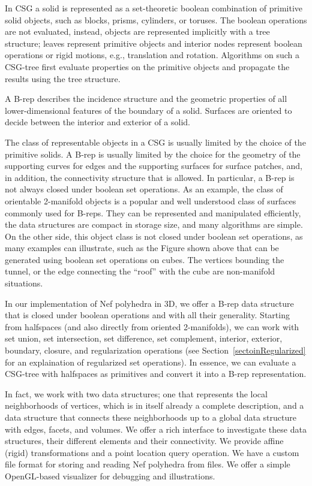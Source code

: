 In CSG a solid is represented as a set-theoretic boolean combination
of primitive solid objects, such as blocks, prisms, cylinders, or
toruses.  The boolean operations are not evaluated, instead, objects
are represented implicitly with a tree structure; leaves represent
primitive objects and interior nodes represent boolean operations or
rigid motions, e.g., translation and rotation. Algorithms on such a
CSG-tree first evaluate properties on the primitive objects and
propagate the results using the tree structure.
 
A B-rep describes the incidence structure and the geometric properties
of all lower-dimensional features of the boundary of a solid. Surfaces
are oriented to decide between the interior and exterior of a solid.

The class of representable objects in a CSG is usually limited by the
choice of the primitive solids. A B-rep is usually limited by the
choice for the geometry of the supporting curves for edges and the
supporting surfaces for surface patches, and, in addition, the
connectivity structure that is allowed. In particular, a B-rep is not
always closed under boolean set operations.  As an example, the class
of orientable 2-manifold objects is a popular and well understood
class of surfaces commonly used for B-reps. They can be represented
and manipulated efficiently, the data structures are compact in
storage size, and many algorithms are simple. On the other side, this
object class is not closed under boolean set operations, as many
examples can illustrate, such as the Figure shown above that can be
generated using boolean set operations on cubes. The vertices bounding
the tunnel, or the edge connecting the ``roof'' with the cube are
non-manifold situations.

In our implementation of Nef polyhedra in 3D, we offer a B-rep data
structure that is closed under boolean operations and with all their
generality. Starting from halfspaces (and also directly from oriented
2-manifolds), we can work with set union, set intersection, set
difference, set complement, interior, exterior, boundary, closure, and
regularization operations (see Section~\ref{sectoinRegularized} 
for an explaination of regularized
set operations). In essence, we can evaluate a CSG-tree with
halfspaces as primitives and convert it into a B-rep representation.

In fact, we work with two data structures; one that represents the
local neighborhoods of vertices, which is in itself already a complete
description, and a data structure that connects these neighborhoods up
to a global data structure with edges, facets, and volumes. We offer a
rich interface to investigate these data structures, their different
elements and their connectivity. We provide affine (rigid)
transformations and a point location query operation. We have a custom
file format for storing and reading Nef polyhedra from files. We offer
a simple OpenGL-based visualizer for debugging and illustrations.


